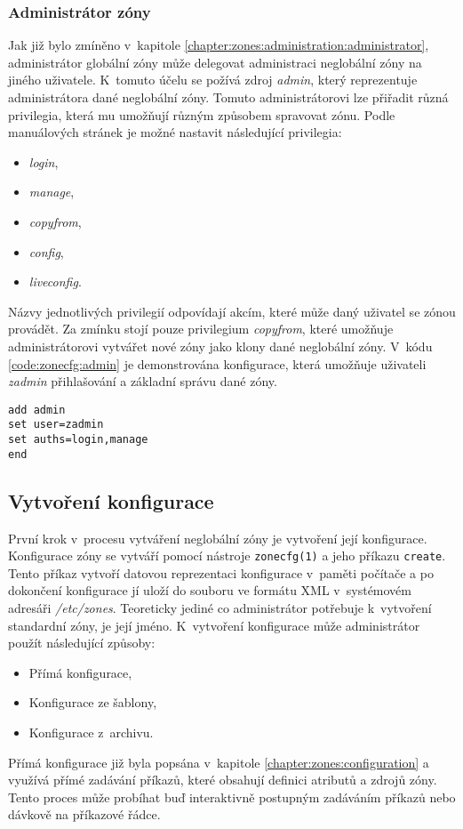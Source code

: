 \subsubsection{Administrátor zóny}
\label{chapter:zones:configuration:resources:admin}
Jak již bylo zmíněno v~kapitole \ref{chapter:zones:administration:administrator}, administrátor globální zóny může delegovat 
administraci neglobální zóny na jiného uživatele. K~tomuto účelu se požívá zdroj \textit{admin}, který reprezentuje administrátora
dané neglobální zóny. Tomuto administrátorovi lze přiřadit různá privilegia, která mu umožňují různým způsobem spravovat zónu.
Podle manuálových stránek \cite{oracle:manpages:zonecfg} je možné nastavit následující privilegia:
\begin{itemize}
 \item \textit{login},
 \item \textit{manage},
 \item \textit{copyfrom},
 \item \textit{config},
 \item \textit{liveconfig}.
\end{itemize}
Názvy jednotlivých privilegií odpovídají akcím, které může daný uživatel se zónou provádět. Za zmínku stojí pouze
privilegium \textit{copyfrom}, které umožňuje administrátorovi vytvářet nové zóny jako klony dané neglobální zóny. V~kódu
\ref{code:zonecfg:admin} je demonstrována konfigurace, která umožňuje uživateli \textit{zadmin} přihlašování a základní správu
dané zóny.
\begin{lstlisting}[caption={Delegace administrace jinému uživateli}, float, label={code:zonecfg:admin}]
add admin
set user=zadmin
set auths=login,manage
end
\end{lstlisting}
\subsection{Vytvoření konfigurace}
\label{chapter:zones:configuration:creating}
První krok v~procesu vytváření neglobální zóny je vytvoření její konfigurace. Konfigurace zóny se vytváří pomocí nástroje 
\verb|zonecfg(1)| a jeho příkazu \verb|create|. Tento příkaz vytvoří datovou reprezentaci konfigurace v~paměti počítače a
po dokončení konfigurace jí uloží do souboru ve formátu XML v~systémovém adresáři \textit{/etc/zones}. Teoreticky jediné co
administrátor potřebuje k~vytvoření standardní zóny, je její jméno. K~vytvoření konfigurace může administrátor použít
následující způsoby:
\begin{itemize}
 \item Přímá konfigurace,
 \item Konfigurace ze šablony,
 \item Konfigurace z~archivu.
\end{itemize}
Přímá konfigurace již byla popsána v~kapitole \ref{chapter:zones:configuration} a využívá přímé zadávání příkazů, které obsahují
definici atributů a zdrojů zóny. Tento proces může probíhat buď interaktivně postupným zadáváním příkazů nebo dávkově na
příkazové řádce.

